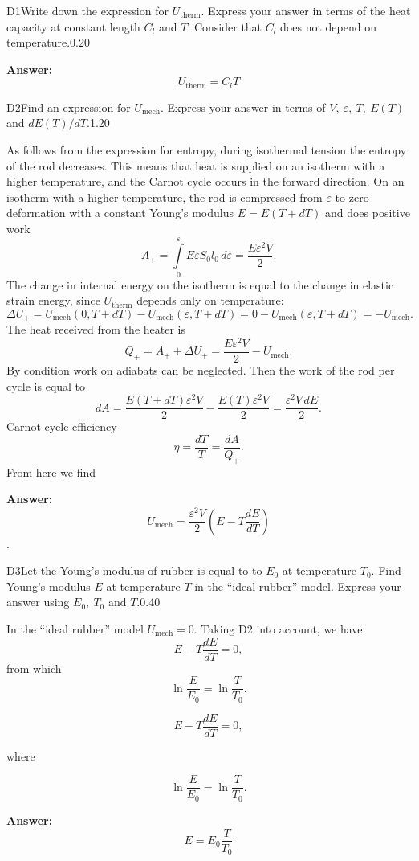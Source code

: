 \documentclass[11pt,a4paper]{article}
\begin{document}
\begin{solcard}{D1}{Write down the expression for $U_\text{therm}$. Express your answer in terms of the heat capacity at constant length $C_l$ and $T$. Consider that $C_l$ does not depend on temperature.}{0.20}
\par\smallskip\noindent\textbf{Answer:} $$U_\text{therm} = C_lT$$
\end{solcard}

\begin{solcard}{D2}{Find an expression for $U_\text{mech}$. Express your answer in terms of $V,~\varepsilon,~T,~E(T)$ and $dE(T)/dT$.}{1.20}

As follows from the expression for entropy, during isothermal tension the entropy of the rod decreases. This means that heat is supplied on an isotherm with a higher temperature, and the Carnot cycle occurs in the forward direction. On an isotherm with a higher temperature, the rod is compressed from $\varepsilon$ to zero deformation with a constant Young's modulus $E=E(T +dT)$ and does positive work \[ A_+ = \int\limits_0^\varepsilon E\varepsilon S_0l_0\,d\varepsilon = \dfrac{E\varepsilon^2V}{2}. \] The change in internal energy on the isotherm is equal to the change in elastic strain energy, since $U_\text{therm}$ depends only on temperature: \[ \Delta U_+ =U_\text{mech}(0,T+dT) - U_\text{mech}(\varepsilon,T+dT)  = 0 - U_\text{mech}(\varepsilon,T+dT) = - U_\text{mech}.\]The heat received from the heater is \[ Q_+ = A_+ + \Delta U_+ =  \dfrac{E\varepsilon^2V}{2} - U_\text{mech}.\] By condition work on adiabats can be neglected. Then the work of the rod per cycle is equal to \[ dA =  \dfrac{E(T+dT)\varepsilon^2V}{2} -  \dfrac{E(T)\varepsilon^2V}{2} = \dfrac{ \varepsilon^2 V\,dE}{2}.\]Carnot cycle efficiency \[ \eta = \dfrac{dT}{T} = \dfrac{dA}{Q_+}. \] From here we find

\par\smallskip\noindent\textbf{Answer:} \[ U_\text{mech} = \dfrac{\varepsilon^2 V}{2}\left(E - T\dfrac{dE}{dT}\right)\].
\end{solcard}

\begin{solcard}{D3}{Let the Young's modulus of rubber is equal to to $E_0$ at temperature $T_0$. Find Young's modulus $E$ at temperature $T$ in the “ideal rubber” model. Express your answer using $E_0,~T_0$ and $T$.}{0.40}

In the “ideal rubber” model $U_\text{mech} =0$. Taking D2 into account, we have $$ E - T\dfrac{dE}{dT} = 0,$$ from which $$ \ln\dfrac{E}{E_0} = \ln\dfrac{T}{T_0}.$$


$$ E - T\dfrac{dE}{dT} = 0,$$


where


$$ \ln\dfrac{E}{E_0} = \ln\dfrac{T}{T_0}.$$

\par\smallskip\noindent\textbf{Answer:} \[ E= E_0\dfrac{T}{T_0}\]
\end{solcard}
\end{document}
